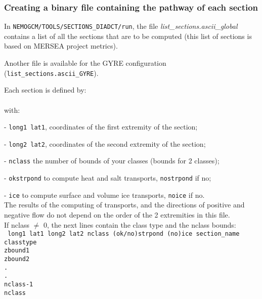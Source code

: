 \documentclass[../main/NEMO_manual]{subfiles}
\begin{document}
\subsubsection{Creating a binary file containing the pathway of each section}

In \texttt{NEMOGCM/TOOLS/SECTIONS\_DIADCT/run},
the file \textit{ {list\_sections.ascii\_global}} contains a list of all the sections that are to be computed
(this list of sections is based on MERSEA project metrics).

Another file is available for the GYRE configuration (\texttt{ {list\_sections.ascii\_GYRE}}).

Each section is defined by: \\
 \\
with:

 - \texttt{long1 lat1}, coordinates of the  first extremity of the section;

 - \texttt{long2 lat2}, coordinates of the second extremity of the section;

 - \texttt{nclass}    the number of bounds of your classes (\eg bounds for 2 classes);

 - \texttt{okstrpond} to compute    heat and       salt transports, \texttt{nostrpond} if no;

 - \texttt{ice}       to compute surface and volume ice transports, \texttt{noice}     if no. \\

 \noindent The results of the computing of transports, and the directions of positive and
 negative flow do not depend on the order of the 2 extremities in this file. \\

\noindent If nclass $\neq$ 0, the next lines contain the class type and the nclass bounds: \\
{\scriptsize
  \texttt{
    long1 lat1 long2 lat2 nclass (ok/no)strpond (no)ice section\_name \\
    classtype                                                         \\
    zbound1                                                           \\
    zbound2                                                           \\
    .                                                                 \\
    .                                                                 \\
    nclass-1                                                          \\
    nclass}
}
\end{document}
